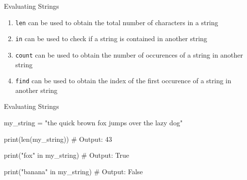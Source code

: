 \begin{frame}[fragile]{Evaluating Strings}

    \begin{enumerate}

        \item \texttt{len} can be used to obtain the total number of characters in a string
        \item \texttt{in} can be used to check if a string is contained in another string
        \item \texttt{count} can be used to obtain the number of occurences of a string in another string
        \item \texttt{find} can be used to obtain the index of the first occurence of a string in another string

    \end{enumerate}



\end{frame}

\begin{frame}[fragile]{Evaluating Strings}

    \begin{pythoncode}

my_string = "the quick brown fox jumps over the lazy dog"

print(len(my_string))
# Output: 43

print("fox" in my_string)
# Output: True

print("banana" in my_string)
# Output: False

    \end{pythoncode}


\end{frame}

